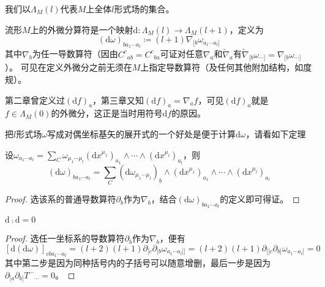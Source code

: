我们以$\Lambda_M(l)$代表$M$上全体$l$形式场的集合。

\begin{definition}
    流形$M$上的外微分算符是一个映射$\mathrm{d} \colon \Lambda_M(l) \to \Lambda_M(l + 1)$，定义为
    $$(\mathrm{d}\omega)_{b a_1 \cdots a_l} \coloneq (l + 1)\nabla_{[b}\omega_{a_1 \cdots a_l]}$$
    其中$\nabla_b$为任一导数算符（因由$C^c{}_{ab} = C^c{}_{ba}$可证对任意$\nabla_a$和$\tilde\nabla_a$有$\tilde\nabla_{[b}\omega_{\cdots]} = \nabla_{[b}\omega_{\cdots]}$）。
    可见在定义外微分之前无须在$M$上指定导数算符（及任何其他附加结构，如度规）。
\end{definition}

\begin{example}
    第二章曾定义过$(\mathrm{d}f)_a$，第三章又知$(\mathrm{d}f)_a = \nabla_af$，可见$(\mathrm{d}f)_a$就是$f \in \Lambda_M(0)$的外微分，这正是当时用符号$\mathrm{d}f$的原因。
\end{example}

把$l$形式场$\omega$写成对偶坐标基矢的展开式的一个好处是便于计算$\mathrm{d}\omega$，请看如下定理

\begin{theorem}
    设$\omega_{a_1 \cdots a_l} = \sum\limits_C \omega_{\mu_1 \cdots \mu_l}(\mathrm{d}x^{\mu_1})_{a_1} \wedge \cdots \wedge (\mathrm{d}x^{\mu_l})_{a_l}$，则
    $$(\mathrm{d}\omega)_{b a_1 \cdots a_l} = \sum_C (\mathrm{d}\omega_{\mu_1 \cdots \mu_l})_b \wedge (\mathrm{d}x^{\mu_1})_{a_1} \wedge \cdots \wedge (\mathrm{d}x^{\mu_l})_{a_l}$$
\end{theorem}

\begin{proof}
    选该系的普通导数算符$\partial_b$作为$\nabla_b$，结合$(\mathrm{d}\omega)_{b a_1 \cdots a_l}$的定义即可得证。
\end{proof}

\begin{theorem}
    $\mathrm{d} \comp \mathrm{d} = 0$
\end{theorem}

\begin{proof}
    选任一坐标系的导数算符$\partial_b$作为$\nabla_b$，便有
    $$[\mathrm{d}(\mathrm{d}\omega)]_{c b a_1 \cdots a_l} = (l + 2)(l + 1)\partial_{[c}\partial_{[b}\omega_{a_1 \cdots a_l]]} = (l + 2)(l + 1)\partial_{[[c}\partial_{b]}\omega_{a_1 \cdots a_l]} = 0$$
    其中第二步是因为同种括号内的子括号可以随意增删，最后一步是因为$\partial_{[a}\partial_{b]}T^{\cdots}{}_{\cdots} = 0$。
\end{proof}

